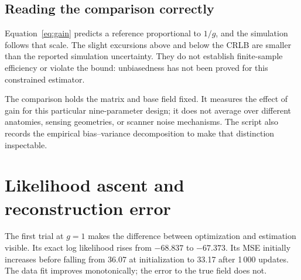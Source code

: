 \documentclass[11pt,a4paper]{article}
\newcommand{\sectionpage}[2]{\clearpage\section{#1}\label{#2}}
\begin{document}
\subsection*{Reading the comparison correctly}
Equation~\eqref{eq:gain} predicts a reference proportional to $1/g$, and the simulation follows that scale. The slight excursions above and below the CRLB are smaller than the reported simulation uncertainty. They do not establish finite-sample efficiency or violate the bound: unbiasedness has not been proved for this constrained estimator.

The comparison holds the matrix and base field fixed. It measures the effect of gain for this particular nine-parameter design; it does not average over different anatomies, sensing geometries, or scanner noise mechanisms. The script also records the empirical bias--variance decomposition to make that distinction inspectable.

\sectionpage{Likelihood ascent and reconstruction error}{sec:convergence}
The first trial at $g=1$ makes the difference between optimization and estimation visible. Its exact log likelihood rises from $-68.837$ to $-67.373$. Its MSE initially increases before falling from 36.07 at initialization to 33.17 after 1\,000 updates. The data fit improves monotonically; the error to the true field does not.
\end{document}
